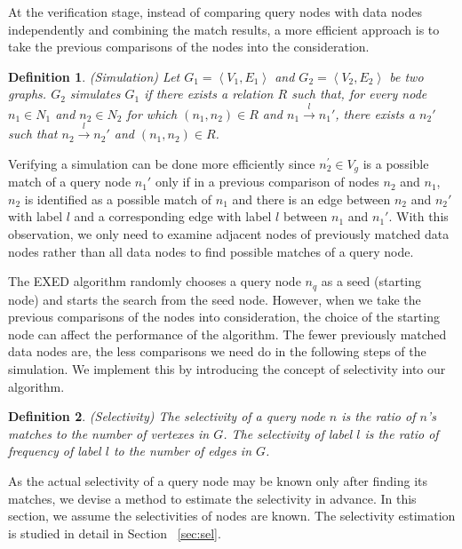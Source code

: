 \documentclass{sigmod}
\newtheorem{definition}{Definition}
\begin{document}
At the verification stage, instead of comparing query nodes with data nodes independently and combining the match results, a more efficient approach is to take the previous comparisons of the nodes into the consideration. \begin{definition}{(Simulation)}
Let  $G_1 = \left \langle V_1, E_1\right\rangle$ and $G_2 = \left \langle V_2, E_2\right\rangle$ be two graphs. $G_2$ simulates $G_1$ if there exists  a relation $R$ such that, for every node $n_1 \in N_1$ and $n_2 \in N_2$ for which $(n_1,n_2) \in R$ and $n_1 \xrightarrow{l} n_1'$, there exists a $n_2'$ such that $n_2 \xrightarrow{l} n_2'$ and $(n_1,n_2) \in R$.
\end{definition}

Verifying a simulation can be done more efficiently since $n_{2}^\prime \in V_g$ is a possible match of a query node $n_{1}'$ only if in a previous comparison of nodes $n_{2}$ and  $n_{1}$, $n_{2}$ is identified as a possible match of $n_{1}$ and there is an edge between $n_{2}$ and $n_{2}'$ with label $l$ and a corresponding edge with label $l$ between $n_{1}$ and $n_{1}'$. With this observation, we only need to examine adjacent nodes of previously matched data nodes rather than all data nodes to find possible matches of a query node.  

The EXED algorithm randomly chooses a query node $n_q$ as a seed (starting node) and starts the search from the seed node. However, when we take the previous comparisons of the nodes into consideration, the choice of the starting node can affect the performance of the algorithm. The fewer previously matched data nodes are, the less comparisons we need do in the following steps of the simulation. We implement this by introducing the concept of selectivity into our algorithm. 

\begin{definition}{(Selectivity)}
The selectivity of a query node $n$ is the ratio of $n$'s matches to the number of vertexes in $G$. The selectivity of label $l$ is the ratio of frequency of label $l$ to the number of edges in $G$.
\end{definition}

As the actual selectivity of a query node may be known only after finding its matches, we devise a method to estimate the selectivity in advance. In this section, we assume the selectivities of nodes are known. The selectivity estimation is studied in detail in Section ~\ref{sec:sel}.   
\end{document}
